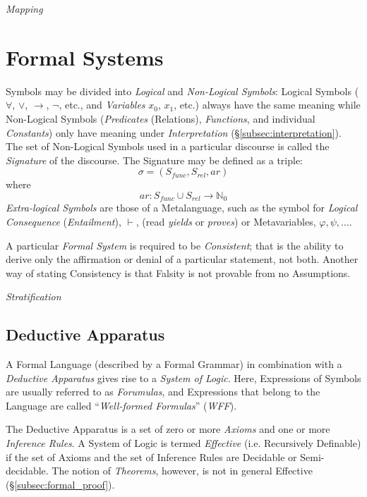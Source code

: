 \documentclass{article}
\begin{document}
\emph{Mapping} %



\section{Formal Systems}\label{sec:formal_systems}

Symbols may be divided into \emph{Logical} and \emph{Non-Logical
  Symbols}: Logical Symbols ($\forall$, $\vee$, $\rightarrow$, $\neg$,
etc., and \emph{Variables} $x_0$, $x_1$, etc.) always have the same
meaning while Non-Logical Symbols (\emph{Predicates} (Relations),
\emph{Functions}, and individual \emph{Constants}) only have meaning
under \emph{Interpretation} (\S\ref{subsec:interpretation}). The set of
Non-Logical Symbols used in a particular discourse is called the
\emph{Signature} of the discourse. The Signature may be defined as a
triple:
\[
    \sigma = (S_{func},S_{rel},ar)
\]
where
\[
    ar: S_{func} \cup S_{rel} \rightarrow \mathbb{N}_0
\]
\emph{Extra-logical Symbols} are those of a Metalanguage, such as the
symbol for \emph{Logical Consequence} (\emph{Entailment}), $\vdash$,
(read \emph{yields} or \emph{proves}) or Metavariables, $\varphi,
\psi, \ldots$.

A particular \emph{Formal System} is required to be \emph{Consistent}; that
is the ability to derive only the affirmation or denial of a
particular statement, not both. Another way of stating Consistency is
that Falsity is not provable from no Assumptions.

\emph{Stratification}

\subsection{Deductive Apparatus} \label{subsec:deductive_apparatus}

A Formal Language (described by a Formal Grammar) in combination with
a \emph{Deductive Apparatus} gives rise to a \emph{System of
  Logic}. Here, Expressions of Symbols are usually referred to as
\emph{Forumulas}, and Expressions that belong to the Language are
called ``\emph{Well-formed Formulas}'' (\emph{WFF}).

The Deductive Apparatus is a set of zero or more \emph{Axioms} and one
or more \emph{Inference Rules}. A System of Logic is termed
\emph{Effective} (i.e. Recursively Definable) if the set of Axioms and
the set of Inference Rules are Decidable or Semi-decidable. The notion
of \emph{Theorems}, however, is not in general Effective
(\S\ref{subsec:formal_proof}).
\end{document}
